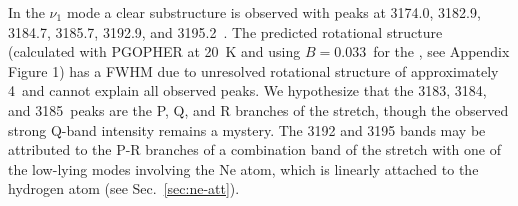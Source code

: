 In the $\nu_1$ mode a clear substructure is observed with peaks at 3174.0, 3182.9, 3184.7, 3185.7, 3192.9, and 3195.2~\wns. The predicted rotational structure (calculated with PGOPHER \cite{western_pgopher_2017} at 20~K and using $B = 0.033$~\wns for the \neion, see Appendix Figure 1) has a FWHM due to unresolved rotational structure of approximately 4~\wns and cannot explain all observed peaks. We hypothesize that the 3183, 3184, and 3185~\wns peaks are the P, Q, and R branches of the  stretch, though the observed strong Q-band intensity remains a mystery. The 3192 and 3195 \wns bands may be attributed to the P-R branches of a combination band of the  stretch with one of the low-lying modes involving the Ne atom, which is linearly attached to the hydrogen atom (see Sec.~\ref{sec:ne-att}).

